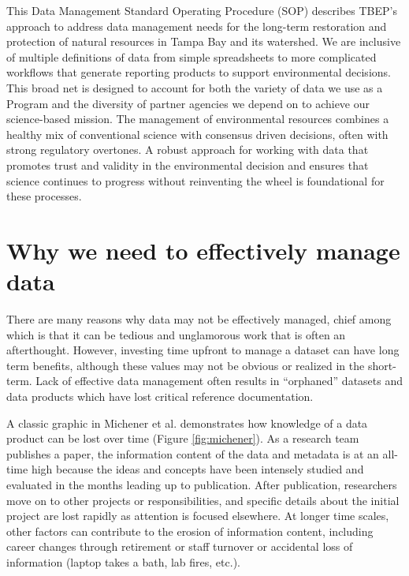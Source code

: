 \documentclass[
]{book}
\begin{document}
This Data Management Standard Operating Procedure (SOP) describes TBEP's approach to address data management needs for the long-term restoration and protection of natural resources in Tampa Bay and its watershed. We are inclusive of multiple definitions of data from simple spreadsheets to more complicated workflows that generate reporting products to support environmental decisions. This broad net is designed to account for both the variety of data we use as a Program and the diversity of partner agencies we depend on to achieve our science-based mission. The management of environmental resources combines a healthy mix of conventional science with consensus driven decisions, often with strong regulatory overtones. A robust approach for working with data that promotes trust and validity in the environmental decision and ensures that science continues to progress without reinventing the wheel is foundational for these processes.

\section{Why we need to effectively manage data}\label{whymanage}

There are many reasons why data may not be effectively managed, chief among which is that it can be tedious and unglamorous work that is often an afterthought. However, investing time upfront to manage a dataset can have long term benefits, although these values may not be obvious or realized in the short-term. Lack of effective data management often results in ``orphaned'' datasets and data products which have lost critical reference documentation.

A classic graphic in Michener et al. \citep{Michener97} demonstrates how knowledge of a data product can be lost over time (Figure \ref{fig:michener}). As a research team publishes a paper, the information content of the data and metadata is at an all-time high because the ideas and concepts have been intensely studied and evaluated in the months leading up to publication. After publication, researchers move on to other projects or responsibilities, and specific details about the initial project are lost rapidly as attention is focused elsewhere. At longer time scales, other factors can contribute to the erosion of information content, including career changes through retirement or staff turnover or accidental loss of information (laptop takes a bath, lab fires, etc.).
\end{document}
